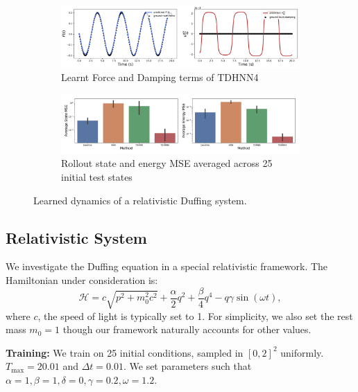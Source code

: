 \documentclass{article}
\begin{document}
\begin{figure}[h!]
\centering
\captionsetup{justification=centering}
	\begin{subfigure}[b]{0.48\textwidth}
		\centering
		\includegraphics[width=\textwidth]{figures/figures/relativity/1/relativity_dpdt_new_0.pdf}
		\caption{Learnt Force and Damping terms of TDHNN4}
	\end{subfigure}
	\begin{subfigure}[b]{0.48\textwidth}
	    \centering
		\includegraphics[width=\textwidth]{figures/figures/relativity/1/relativity_errors_0.pdf}
		\caption{Rollout state and energy MSE averaged across 25 initial test states}
	\end{subfigure}
\caption{Learned dynamics of a relativistic Duffing system.}
\end{figure}
\subsection{Relativistic System}
We investigate the Duffing equation in a special relativistic framework. The Hamiltonian under consideration is:
\begin{equation}
\mathcal{H} =  c\sqrt{p^2 +m_0^2c^2} + \frac{\alpha}{2}q^2 +\frac{\beta}{4}q^4 - q\gamma\sin(\omega t),
\end{equation}
where $c$, the speed of light is typically set to 1. For simplicity, we also set the rest mass $m_0=1$ though our framework naturally accounts for other values.

\textbf{Training:} We train on 25 initial conditions, sampled in $[0,2]^2$ uniformly. $T_{\max} = 20.01$ and $\Delta t = 0.01$. We set parameters such that $\alpha =1, \beta =1,\delta =0,\gamma = 0.2,\omega = 1.2$.
\end{document}
